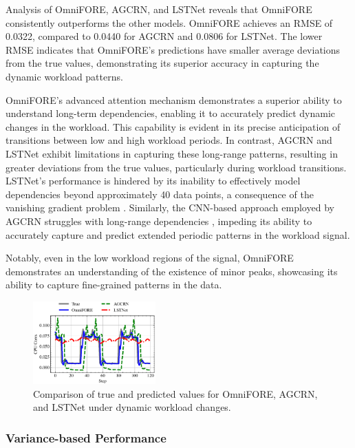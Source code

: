 \documentclass{ieeetmlcn}
\begin{document}
Analysis of OmniFORE, AGCRN, and LSTNet reveals that OmniFORE consistently outperforms the other models. OmniFORE achieves an RMSE of 0.0322, compared to 0.0440 for AGCRN and 0.0806 for LSTNet. The lower RMSE indicates that OmniFORE's predictions have smaller average deviations from the true values, demonstrating its superior accuracy in capturing the dynamic workload patterns.

OmniFORE's advanced attention mechanism demonstrates a superior ability to understand long-term dependencies, enabling it to accurately predict dynamic changes in the workload. This capability is evident in its precise anticipation of transitions between low and high workload periods. In contrast, AGCRN and LSTNet exhibit limitations in capturing these long-range patterns, resulting in greater deviations from the true values, particularly during workload transitions. LSTNet's performance is hindered by its inability to effectively model dependencies beyond approximately 40 data points, a consequence of the vanishing gradient problem \cite{zhou2021informer}. Similarly, the CNN-based approach employed by AGCRN struggles with long-range dependencies \cite{acmtimeseriesreview2024, hochreiter1998vanishing}, impeding its ability to accurately capture and predict extended periodic patterns in the workload signal.

Notably, even in the low workload regions of the signal, OmniFORE demonstrates an understanding of the existence of minor peaks, showcasing its ability to capture fine-grained patterns in the data.

\begin{figure}
\centering
\includegraphics[width=0.42\textwidth]{img/dynamic_workload_changes.eps}
\caption{Comparison of true and predicted values for OmniFORE, AGCRN, and LSTNet under dynamic workload changes.}
\label{fig:dynamic_workload_changes}
\end{figure}

\subsubsection{\textbf{Variance-based Performance}}
\end{document}
